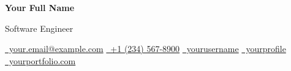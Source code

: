 \begin{center}
    {\Huge\bfseries\color{primaryblue} Your Full Name}
    
    \vspace{6pt}
    {\large\color{textgray} Software Engineer}
    
    \vspace{10pt}
    \href{mailto:your.email@example.com}{\faEnvelope\ your.email@example.com} \quad
    \href{tel:+1234567890}{\faPhone\ +1 (234) 567-8900} \quad
    \href{https://github.com/yourusername}{\faGithub\ yourusername} \quad
    \href{https://linkedin.com/in/yourprofile}{\faLinkedin\ yourprofile} \quad
    \href{https://yourportfolio.com}{\faGlobe\ yourportfolio.com}
\end{center}

\vspace{12pt} 